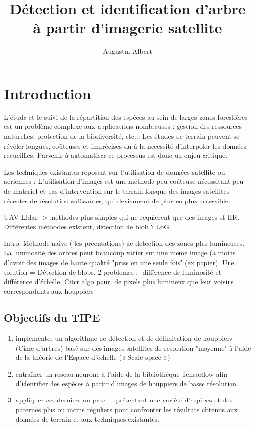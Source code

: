 \documentclass{article}
\title{Détection et identification d'arbre à partir d'imagerie satellite}
\author{Augustin Albert}
\begin{document}
\maketitle
\tableofcontents

\section*{Introduction}

L'étude et le suivi de la répartition des espèces au sein de larges zones forestières est un problème complexe aux applications nombreuses :
gestion des ressources naturelles, protection de la biodiversité, etc... Les études de terrain peuvent se révéler longues, coûteuses et imprécises du à la nécessité d'interpoler les données recueillies. 
Parvenir à automatiser ce processus est donc un enjeu critique. 

Les techniques existantes reposent sur l'utilisation de données satellite ou aériennes : L'utilisation d'images est une méthode peu coûteuse nécessitant peu de materiel et pas d'intervention sur le terrain lorsque 
des images satellites récentes de résolution suffisantes, qui deviennent de plus en plus accessible.  

UAV LIdar -> methodes plus simples qui ne requierent que des images st HR. Différentes méthodes existent, detection de blob ? LoG

Intro: Méthode naive ( les preentations) de detection des zones plus lumineuses. La luminosité des arbres peut beaucoup varier sur une meme image (à moins d'avoir des images de haute qualité "prise en une seule fois" (ex papier). Une solution = Détection de blobs. 2 problemes : -différence de luminosité et différence d'échelle. Citer algo pour. de pixels plus lumineux que leur voisins correspondants aux houppiers


\subsection*{Objectifs du TIPE}		
\begin{enumerate}
	\item implementer un algorithme de détection et de délimitation de houppiers (Cime d'arbres) basé sur des images satellites de resolution "moyenne" à l'aide de la théorie de l'Espace d'échelle (« Scale-space ») 
	\item entraîner un reseau neurone à l'aide de la bibliothèque Tensorflow afin d'identifier des espèces à partir d'images de houppiers de basse résolution 
	\item appliquer ces derniers au parc ... présentant une variété d'espèces et des paternes plus ou moins réguliers pour confronter les résultats obtenus aux données de terrain et aux techniques existantes.    
\end{enumerate}
	
\end{document}

